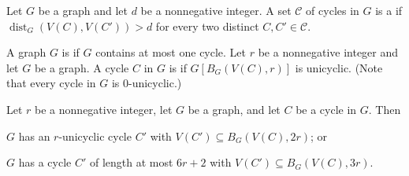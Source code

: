 \documentclass{patmorin}
\DeclareMathOperator{\dist}{dist}
\begin{document}
Let $G$ be a graph and let $d$ be a nonnegative integer. A set $\mathcal{C}$ of cycles in $G$ is a  if $\dist_G(V(C),V(C'))> d$ for every two distinct $C,C'\in\mathcal{C}$.

A graph $G$ is  if $G$ contains at most one cycle.  Let $r$ be a nonnegative integer and let $G$ be a graph. A cycle $C$ in $G$ is  if $G[B_G(V(C),r)]$ is unicyclic. (Note that every cycle in $G$ is $0$-unicyclic.)

\begin{lem}\label{short_or_unicycle_nearby}
  Let $r$ be a nonnegative integer, let $G$ be a graph, and let $C$ be a cycle in $G$. Then
  \begin{tightenum}%
    \item $G$ has an $r$-unicyclic cycle $C'$ with $V(C')\subseteq B_G(V(C),2r)$; or\label{short_or_unicycle_nearby:unicyclic}
    \item $G$ has a cycle $C'$ of length at most $6r+2$ with $V(C')\subseteq B_G(V(C),3r)$.\label{short_or_unicycle_nearby:short}
  \end{tightenum}
\end{lem}
\end{document}
